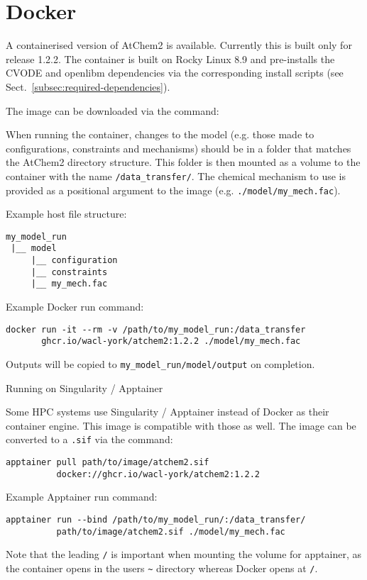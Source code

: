 \section{Docker} \label{sec:docker}

A containerised version of AtChem2 is available. Currently this is
built only for release 1.2.2. The container is built on Rocky Linux
8.9 and pre-installs the CVODE and openlibm dependencies via the
corresponding install scripts (see Sect.~\ref{subsec:required-dependencies}).

The image can be downloaded via the command:

When running the container, changes to the model (e.g. those made to
configurations, constraints and mechanisms) should be in a folder that
matches the AtChem2 directory structure. This folder is then mounted
as a volume to the container with the name \texttt{/data\_transfer/}.
The chemical mechanism to use is provided as a positional argument to
the image (e.g. \texttt{./model/my\_mech.fac}).

Example host file structure:
\begin{verbatim}
my_model_run
 |__ model
     |__ configuration
     |__ constraints
     |__ my_mech.fac
\end{verbatim}

Example Docker run command:

\begin{verbatim}
docker run -it --rm -v /path/to/my_model_run:/data_transfer
       ghcr.io/wacl-york/atchem2:1.2.2 ./model/my_mech.fac
\end{verbatim}

Outputs will be copied to \texttt{my\_model\_run/model/output} on completion.

Running on Singularity / Apptainer

Some HPC systems use Singularity / Apptainer instead of Docker as
their container engine. This image is compatible with those
as well. The image can be converted to a \texttt{.sif} via the command:

\begin{verbatim}
apptainer pull path/to/image/atchem2.sif
          docker://ghcr.io/wacl-york/atchem2:1.2.2
\end{verbatim}

Example Apptainer run command:

\begin{verbatim}
apptainer run --bind /path/to/my_model_run/:/data_transfer/
          path/to/image/atchem2.sif ./model/my_mech.fac
\end{verbatim}

Note that the leading \verb|/| is important when mounting the volume for
apptainer, as the container opens in the users \verb|~| directory whereas
Docker opens at \verb|/|.

